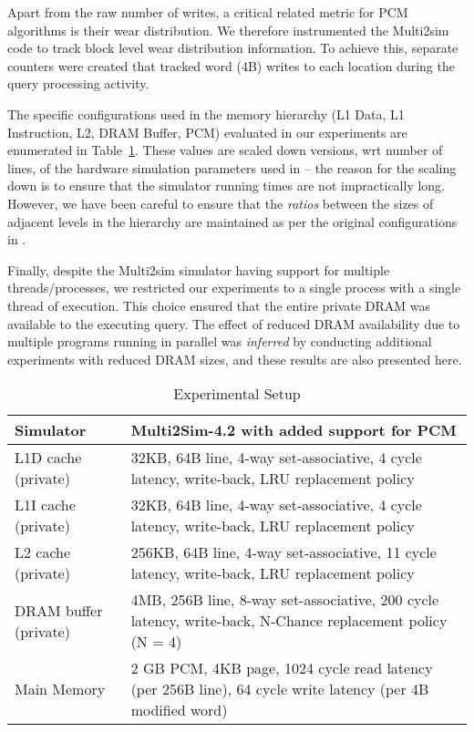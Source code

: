Apart from the raw number of writes, a critical related metric for PCM
algorithms is their wear distribution. We therefore instrumented the
Multi2sim code to track block level wear distribution information. To
achieve this, separate counters were created that tracked word (4B)
writes to each location during the query processing activity.

The specific configurations used in the memory hierarchy (L1 Data,
L1 Instruction, L2, DRAM Buffer, PCM) evaluated in our experiments are
enumerated in Table~\ref{table:setup}.  These values are scaled down
versions, wrt number of lines, of the hardware simulation parameters
used in \cite{wear} -- the reason for the scaling down is to ensure
that the simulator running times are not impractically long. However,
we have been careful to ensure that the \emph{ratios} between the sizes
of adjacent levels in the hierarchy are maintained as per the original
configurations in \cite{wear}.

Finally, despite the Multi2sim simulator having support for multiple
threads/processes, we restricted our experiments to a single process with
a single thread of execution. This choice ensured that the entire private
DRAM was available to the executing query. The effect of reduced DRAM
availability due to multiple programs running in parallel was \emph{inferred}
by conducting additional experiments with reduced DRAM sizes, and 
these results are also presented here.

\begin{center}
\begin{table}[htbp]
\caption{Experimental Setup}
\label{table:setup}
\begin{tabular}{p{3.0cm}p{5.0cm}}
\toprule
Simulator & Multi2Sim-4.2 with added support for PCM\\ \hline

L1D cache (private) & 32KB, 64B line, 4-way set-associative, 4 cycle latency, write-back, LRU replacement policy\\ \hline
L1I cache (private) & 32KB, 64B line, 4-way set-associative, 4 cycle latency, write-back, LRU replacement policy\\ \hline   
L2 cache (private) & 256KB, 64B line, 4-way set-associative, 11 cycle latency, write-back, LRU replacement policy\\ \hline

DRAM buffer (private) & 4MB, 256B line, 8-way set-associative, 200 cycle latency, write-back, N-Chance replacement policy (N = 4)\\ \hline

Main Memory & 2 GB PCM, 4KB page, 1024 cycle read latency (per 256B line), 64 cycle write latency (per 4B modified word)\\
\bottomrule
\end{tabular}
\end{table}
\end{center}



